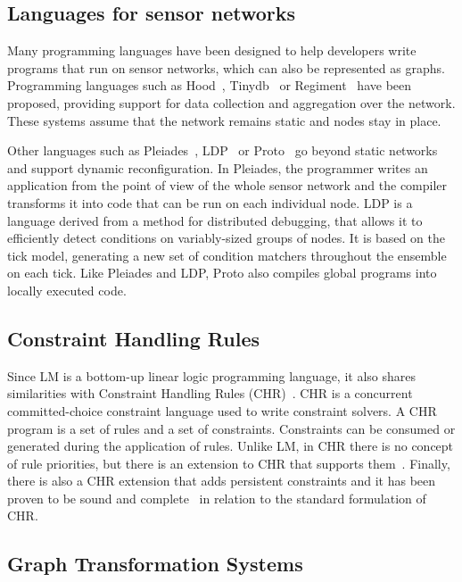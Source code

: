 \subsection{Languages for sensor networks}

Many programming languages have been designed to help developers write programs
that run on sensor networks, which can also be represented as graphs.
Programming languages such as Hood~\cite{Whitehouse:2004:HNA:990064.990079},
Tinydb~\cite{Madden:2005:TAQ:1061318.1061322} or
Regiment~\cite{Newton:2007:RMS:1236360.1236422} have been proposed, providing
support for data collection and aggregation over the network. These systems
assume that the network remains static and nodes stay in place.

Other languages such as Pleiades~\cite{Kothari:2007:REP:1250734.1250757},
LDP~\cite{4543691} or Proto~\cite{Beal:2006:IEE:1137236.1137354} go beyond
static networks and support dynamic reconfiguration. In Pleiades, the
programmer writes an application from the point of view of the whole
sensor network and the compiler transforms it into code that can be run on
each individual node.  LDP is a language derived from a method for
distributed debugging, that allows it to efficiently detect conditions on
variably-sized groups of nodes. It is based on the tick model, generating
a new set of condition matchers throughout the ensemble on each tick.
Like Pleiades and LDP, Proto also compiles global programs into locally
executed code.

\subsection{Constraint Handling Rules}

Since LM is a bottom-up linear logic programming language, it also shares
similarities with Constraint Handling Rules
(CHR)~\cite{Betz:2005kx,Betz:2013:LBA:2422085.2422086}.  CHR is a concurrent
committed-choice constraint language used to write constraint solvers. A CHR
program is a set of rules and a set of constraints. Constraints can be consumed
or generated during the application of rules. Unlike LM, in CHR there is no
concept of rule priorities, but there is an extension to CHR that supports
them~\cite{DeKoninck:2007:URP:1273920.1273924}. Finally, there is also a CHR
extension that adds persistent constraints and it has been proven to be sound
and complete~\cite{DBLP:journals/corr/abs-1007-3829} in relation to the standard
formulation of CHR.

\subsection{Graph Transformation Systems}

